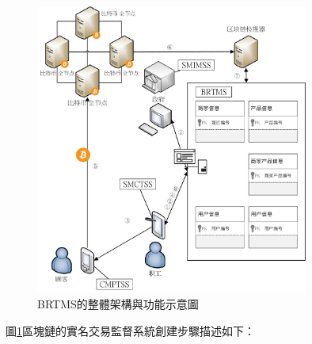 	\begin{figure}[htbp]
		\centering
		\includegraphics[width = 0.8\textwidth]{fig4.jpg}
		\caption{BRTMS的整體架構與功能示意圖}\label{fig4}
	\end{figure}

	圖\ref{fig4}區塊鏈的實名交易監督系統創建步驟描述如下：

